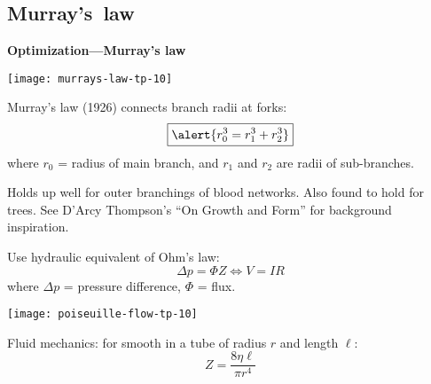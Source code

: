\subsection{Murray's\ law}

  \textbf{Optimization---Murray's law}

      
    \texttt{[image: murrays-law-tp-10]}
    
    
     Murray's law (1926) connects branch radii at forks:\cite{murray1926a,murray1926b,murray1927a,labarbera1990a,thompson1961a}
      $$ \boxed{ \alert{r_0^{3} = r_1^{3} + r_2^{3}}} $$
      where $r_0$ = radius of main branch,
      and $r_1$ and $r_2$ are radii of sub-branches.
    
      
     Holds up well for outer branchings of blood networks.
     Also found to hold for trees\cite{murray1927a,mcculloh2003a,mcculloh2004a}.
     See D'Arcy Thompson's ``On Growth and Form'' for background inspiration\cite{thompson1952a,thompson1961a}.
    




    
     Use hydraulic equivalent of Ohm's law:
      $$
      \Delta p = \Phi Z  \Leftrightarrow V = IR
      $$
      where $\Delta p$ = pressure difference, $\Phi$ = flux.
              
        \texttt{[image: poiseuille-flow-tp-10]}
        
        
        
          Fluid mechanics: 
          for smooth 
          in a tube
          of radius $r$ and length $\ell$:
          $$ Z = \frac{8\eta \ell}{\pi r^4} $$
        

